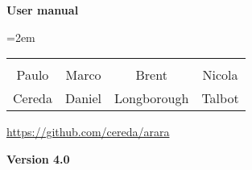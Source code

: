 \documentclass[a4paper,twoside,12pt]{memoir}
\newcommand{\araraversion}{4.0}
\begin{document}
\begin{titlingpage}
\vspace*{2em}

\begin{center}
\scalebox{1.15}{\em add new logo here}

\vspace{2em}

{\Huge\slogan}

\vspace{6em}

\begin{tcolorbox}[
  boxrule=0pt,
  colback=araracolour,
  top=1em,
  bottom=1em
]
  \color{white}
  \centering
  \Huge
  \sffamily
  \bfseries User manual
\end{tcolorbox}

\vspace{6em}

{\tabcolsep=2em
\em

\begin{tabular}{cccc}
  \begin{tikzpicture}[scale=.7]
    \duck[
      cap,
      cricket
    ]
  \end{tikzpicture} &
  \begin{tikzpicture}[scale=.7]
    \duck[
      tshirt=lightgray,
      jacket=blue!50!black,
      tie=blue!80!black,
      shorthair
    ]
  \end{tikzpicture} &
  \begin{tikzpicture}[scale=.7]
    \duck[
      glasses,
      recedinghair,
      jacket=gray
    ]
  \end{tikzpicture} &
  \begin{tikzpicture}[scale=.7]
    \duck[
      longhair,
      hat=red!50!black
    ]
  \end{tikzpicture}\\[.5em]
Paulo & Marco & Brent & Nicola\\
Cereda & Daniel & Longborough & Talbot
\end{tabular}}

\vspace{2em}

\url{https://github.com/cereda/arara}

\vfill

{\color{araracolour}
\LARGE
\sffamily
\bfseries
Version \araraversion}

\end{center}
\end{titlingpage}

\pagestyle{headings} 
\frontmatter
\nouppercaseheads
\end{document}
